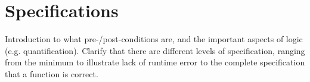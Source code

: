 \section{Specifications}
Introduction to what pre-/post-conditions are, and the important aspects of logic (e.g. quantification).  Clarify that there are different levels of specification, ranging from the minimum to illustrate lack of runtime error to the complete specification that a function is correct.